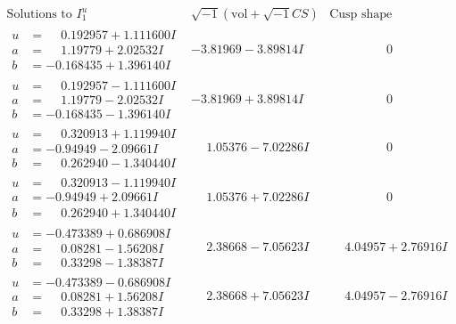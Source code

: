 \documentclass[1p]{elsarticle_modified}
\theoremstyle{definition}
\newcommand{\I}{\sqrt{-1}}
\begin{document}
$$\begin{array}{c|c|c}  
\text{Solutions to }I^u_{1}& \I (\text{vol} + \sqrt{-1}CS) & \text{Cusp shape}\\
 \hline 
\begin{aligned}
u &= \phantom{-}0.192957 + 1.111600 I \\
a &= \phantom{-}1.19779 + 2.02532 I \\
b &= -0.168435 + 1.396140 I\end{aligned}
 & -3.81969 - 3.89814 I & \phantom{-0.000000 } 0 \\ \hline\begin{aligned}
u &= \phantom{-}0.192957 - 1.111600 I \\
a &= \phantom{-}1.19779 - 2.02532 I \\
b &= -0.168435 - 1.396140 I\end{aligned}
 & -3.81969 + 3.89814 I & \phantom{-0.000000 } 0 \\ \hline\begin{aligned}
u &= \phantom{-}0.320913 + 1.119940 I \\
a &= -0.94949 - 2.09661 I \\
b &= \phantom{-}0.262940 - 1.340440 I\end{aligned}
 & \phantom{-}1.05376 - 7.02286 I & \phantom{-0.000000 } 0 \\ \hline\begin{aligned}
u &= \phantom{-}0.320913 - 1.119940 I \\
a &= -0.94949 + 2.09661 I \\
b &= \phantom{-}0.262940 + 1.340440 I\end{aligned}
 & \phantom{-}1.05376 + 7.02286 I & \phantom{-0.000000 } 0 \\ \hline\begin{aligned}
u &= -0.473389 + 0.686908 I \\
a &= \phantom{-}0.08281 - 1.56208 I \\
b &= \phantom{-}0.33298 - 1.38387 I\end{aligned}
 & \phantom{-}2.38668 - 7.05623 I & \phantom{-}4.04957 + 2.76916 I \\ \hline\begin{aligned}
u &= -0.473389 - 0.686908 I \\
a &= \phantom{-}0.08281 + 1.56208 I \\
b &= \phantom{-}0.33298 + 1.38387 I\end{aligned}
 & \phantom{-}2.38668 + 7.05623 I & \phantom{-}4.04957 - 2.76916 I \\ \hline\begin{aligned}

\end{aligned}
\end{array}$$
\end{document}
